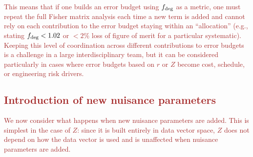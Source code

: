 \documentclass[usenatbib]{mnras}
\newcommand{\changetext}[1]{\textcolor{brown}{#1}}
\begin{document}
\changetext{This means that if one builds an error budget using $f_{\rm deg}$ as a metric, one must repeat the full Fisher matrix analysis each time a new term is added and cannot rely on each contribution to the error budget staying within an ``allocation'' (e.g., stating $f_{\rm deg} < 1.02$ or $<2\%$ loss of figure of merit for a particular systematic). Keeping this level of coordination across different contributions to error budgets is a challenge in a large interdisciplinary team, but it can be considered particularly in cases where error budgets based on $r$ or $Z$ become cost, schedule, or engineering risk drivers.}

\subsection{\changetext{Introduction of new nuisance parameters}}
\label{ss:app-nuisance}

\changetext{We now consider what happens when new nuisance parameters are added. This is simplest in the case of $Z$: since it is built entirely in data vector space, $Z$ does not depend on how the data vector is used and is unaffected when nuisance parameters are added.}
\end{document}
